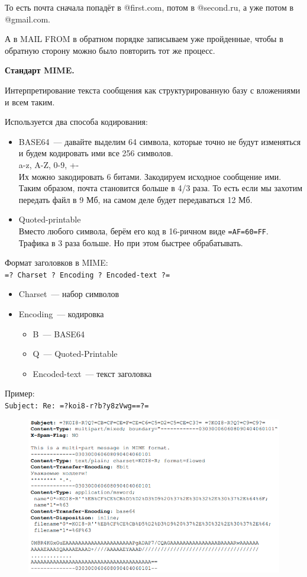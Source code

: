 То есть почта сначала попадёт в @first.com, потом в @second.ru, а уже потом в @gmail.com.

А в MAIL FROM в обратном порядке записываем уже пройденные, чтобы в обратную сторону можно было повторить тот же процесс.

{\bf Стандарт MIME.}

Интерпретирование текста сообщения как структурированную базу с вложениями и всем таким.

Используется два способа кодирования:
\begin{itemize}
    \item BASE64~--- давайте выделим 64 символа, которые точно не будут изменяться и будем кодировать ими все 256 символов.\\
    a-z, A-Z, 0-9, +-\\
    Их можно закодировать 6 битами. Закодируем исходное сообщение ими.\\
    Таким образом, почта становится больше в 4/3 раза. То есть если мы захотим передать файл в 9 Мб, на самом деле будет передаваться 12 Мб.
    \item Quoted-printable\\
    Вместо любого символа, берём его код в 16-ричном виде {\tt =AF=60=FF}.\\
    Трафика в 3 раза больше. Но при этом быстрее обрабатывать.
\end{itemize}

Формат заголовков в MIME:\\
{\tt =? Charset ? Encoding ? Encoded-text ?=}
\begin{itemize}
    \item Charset~--- набор символов
    \item Encoding~--- кодировка
    \begin{itemize}
        \item B~--- BASE64
        \item Q~--- Quoted-Printable
        \item Encoded-text~--- текст заголовка
    \end{itemize}
\end{itemize}

Пример:\\
{\tt Subject: Re: =?koi8-r?b?y8zVwg==?=}

\begin{figure}[H]
  \centering
  \includegraphics[width=15cm]{images/07/01}
\end{figure}


